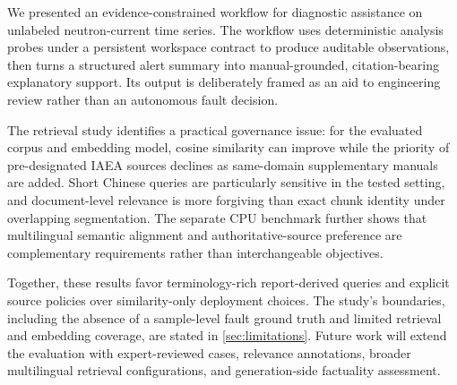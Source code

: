 We presented an evidence-constrained workflow for diagnostic assistance on unlabeled neutron-current time series. The workflow uses deterministic analysis probes under a persistent workspace contract to produce auditable observations, then turns a structured alert summary into manual-grounded, citation-bearing explanatory support. Its output is deliberately framed as an aid to engineering review rather than an autonomous fault decision.

The retrieval study identifies a practical governance issue: for the evaluated corpus and embedding model, cosine similarity can improve while the priority of pre-designated IAEA sources declines as same-domain supplementary manuals are added. Short Chinese queries are particularly sensitive in the tested setting, and document-level relevance is more forgiving than exact chunk identity under overlapping segmentation. The separate CPU benchmark further shows that multilingual semantic alignment and authoritative-source preference are complementary requirements rather than interchangeable objectives.

Together, these results favor terminology-rich report-derived queries and explicit source policies over similarity-only deployment choices. The study's boundaries, including the absence of a sample-level fault ground truth and limited retrieval and embedding coverage, are stated in \cref{sec:limitations}. Future work will extend the evaluation with expert-reviewed cases, relevance annotations, broader multilingual retrieval configurations, and generation-side factuality assessment.
